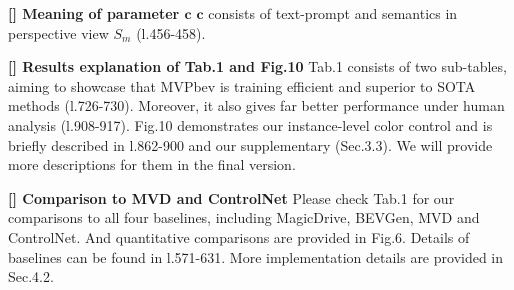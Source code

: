 \documentclass[sigconf,authordraft]{acmart}
\begin{document}

\noindent \textbf{[\rthree] Meaning of parameter $\mathbf{c}$} 
$\mathbf{c}$ consists of text-prompt and semantics in perspective view $S_m$ (l.456-458).

\noindent \textbf{[\rthree] Results explanation of Tab.1 and Fig.10} Tab.1 consists of two sub-tables, aiming to showcase that MVPbev is training efficient and superior to SOTA methods (l.726-730). Moreover, it also gives far better performance under human analysis (l.908-917). Fig.10 demonstrates our instance-level color control and is briefly described in l.862-900 and our supplementary (Sec.3.3). We will provide more descriptions for them in the final version. 

\noindent \textbf{[\rthree] Comparison to MVD and ControlNet} Please check Tab.1 for our comparisons to all four baselines, including MagicDrive, BEVGen, MVD and ControlNet. And quantitative comparisons are provided in Fig.6. Details of baselines can be found in l.571-631. More implementation details are provided in Sec.4.2.

\end{document}
